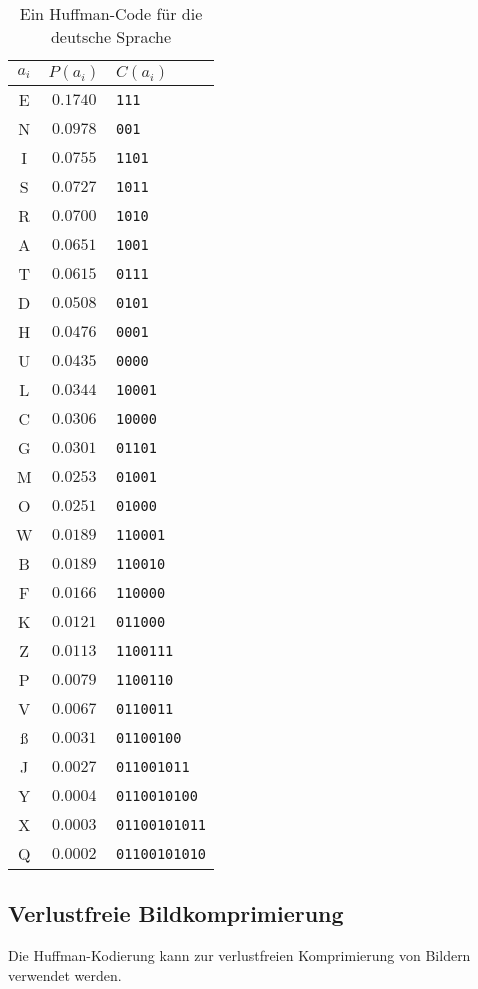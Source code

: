 \documentclass[twoside,11pt,a4paper]{article}
\theoremstyle{break}
\begin{document}
\begin{table}
\centering
\caption{Ein Huffman-Code für die deutsche Sprache}
\vspace{1ex}
\begin{tabular}{c|c|l}
$a_i$ & $P(a_i)$ & $C(a_i)$ \\ \hline
E & $0.1740$ & {\tt111} \\
N & $0.0978$ & {\tt001} \\
I & $0.0755$ & {\tt1101} \\
S & $0.0727$ & {\tt1011} \\
R & $0.0700$ & {\tt1010} \\
A & $0.0651$ & {\tt1001} \\
T & $0.0615$ & {\tt0111} \\
D & $0.0508$ & {\tt0101} \\
H & $0.0476$ & {\tt0001} \\
U & $0.0435$ & {\tt0000} \\
L & $0.0344$ & {\tt10001} \\
C & $0.0306$ & {\tt10000} \\
G & $0.0301$ & {\tt01101} \\
M & $0.0253$ & {\tt01001} \\
O & $0.0251$ & {\tt01000} \\
W & $0.0189$ & {\tt110001} \\
B & $0.0189$ & {\tt110010} \\
F & $0.0166$ & {\tt110000} \\
K & $0.0121$ & {\tt011000} \\
Z & $0.0113$ & {\tt1100111} \\
P & $0.0079$ & {\tt1100110} \\
V & $0.0067$ & {\tt0110011} \\
ß & $0.0031$ & {\tt01100100} \\
J & $0.0027$ & {\tt011001011} \\
Y & $0.0004$ & {\tt0110010100} \\
X & $0.0003$ & {\tt01100101011} \\
Q & $0.0002$ & {\tt01100101010}
\end{tabular}
\label{tab:HGER}
\end{table}

\subsection{Verlustfreie Bildkomprimierung}
Die Huffman-Kodierung kann zur verlustfreien Komprimierung von Bildern
verwendet werden.
\end{document}
